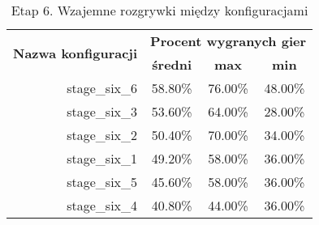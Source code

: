 \begin{longtable}[c]{|r|c|c|c|}
\caption{\label{tab:results/stage_six_all_play_all}Etap 6. Wzajemne rozgrywki między konfiguracjami} \\
\hline

\multirow{2}{*}{\textbf{Nazwa konfiguracji}} & \multicolumn{3}{|c|}{\textbf{Procent wygranych gier}} \\
\cline{2-4}
&\textbf{średni} & \textbf{max} & \textbf{min} \\
\hline
stage\_six\_6 & 58.80\% & 76.00\% & 48.00\% \\
\hline
stage\_six\_3 & 53.60\% & 64.00\% & 28.00\% \\
\hline
stage\_six\_2 & 50.40\% & 70.00\% & 34.00\% \\
\hline
stage\_six\_1 & 49.20\% & 58.00\% & 36.00\% \\
\hline
stage\_six\_5 & 45.60\% & 58.00\% & 36.00\% \\
\hline
stage\_six\_4 & 40.80\% & 44.00\% & 36.00\% \\
\hline
\end{longtable}
